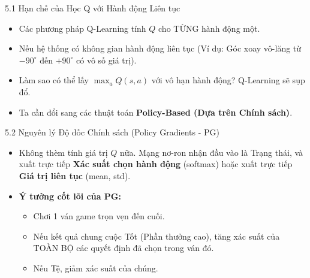 \documentclass[aspectratio=169, 12pt]{beamer}
\begin{document}
\begin{frame}{5.1 Hạn chế của Học Q với Hành động Liên tục}
    \begin{itemize}
        \item Các phương pháp Q-Learning tính $Q$ cho TỪNG hành động một.
        \item Nếu hệ thống có không gian hành động liên tục (Ví dụ: Góc xoay vô-lăng từ $-90^\circ$ đến $+90^\circ$ có vô số giá trị).
        \item Làm sao có thể lấy $\max_a Q(s,a)$ với vô hạn hành động? Q-Learning sẽ sụp đổ.
        \item Ta cần đổi sang các thuật toán \textbf{Policy-Based (Dựa trên Chính sách)}.
    \end{itemize}
\end{frame}

\begin{frame}{5.2 Nguyên lý Độ dốc Chính sách (Policy Gradients - PG)}
    \begin{itemize}
        \item Không thèm tính giá trị $Q$ nữa. Mạng nơ-ron nhận đầu vào là Trạng thái, và xuất trực tiếp \textbf{Xác suất chọn hành động} (softmax) hoặc xuất trực tiếp \textbf{Giá trị liên tục} (mean, std).
        \item \textbf{Ý tưởng cốt lõi của PG:} 
        \begin{itemize}
            \item Chơi 1 ván game trọn vẹn đến cuối.
            \item Nếu kết quả chung cuộc Tốt (Phần thưởng cao), tăng xác suất của TOÀN BỘ các quyết định đã chọn trong ván đó.
            \item Nếu Tệ, giảm xác suất của chúng.
        \end{itemize}
    \end{itemize}
\end{frame}
\end{document}
